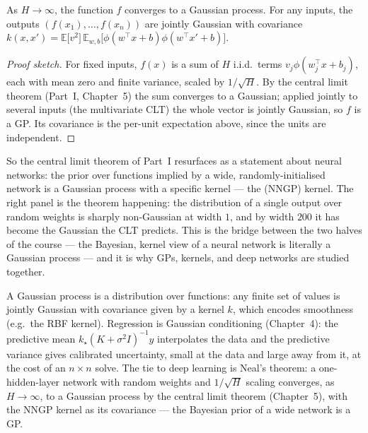 \documentclass[11pt]{article}
\begin{document}
\begin{theorem}
As $H\to\infty$, the function $f$ converges to a Gaussian process. For any inputs,
the outputs $(f(x_1),\dots,f(x_n))$ are jointly Gaussian with covariance
$k(x,x')=\mathbb{E}\big[v^2\big]\,\mathbb{E}_{w,b}\big[\phi(w^\top x+b)\phi(w^\top x'+b)\big]$.
\end{theorem}
\begin{proof}[Proof sketch]
For fixed inputs, $f(x)$ is a sum of $H$ i.i.d.\ terms $v_j\phi(w_j^\top x+b_j)$,
each with mean zero and finite variance, scaled by $1/\sqrt H$. By the central
limit theorem (Part~I, Chapter~5) the sum converges to a Gaussian; applied jointly
to several inputs (the multivariate CLT) the whole vector is jointly Gaussian, so
$f$ is a GP. Its covariance is the per-unit expectation above, since the units are
independent.
\end{proof}

So the central limit theorem of Part~I resurfaces as a statement about neural
networks: the prior over functions implied by a wide, randomly-initialised network
is a Gaussian process with a specific kernel --- the  (NNGP) kernel. The right panel is the theorem happening: the
distribution of a single output over random weights is sharply non-Gaussian at
width $1$, and by width $200$ it has become the Gaussian the CLT predicts. This is
the bridge between the two halves of the course --- the Bayesian, kernel view of a
neural network is literally a Gaussian process --- and it is why GPs, kernels, and
deep networks are studied together.

\begin{summarybox}
A Gaussian process is a distribution over functions: any finite set of values is
jointly Gaussian with covariance given by a kernel $k$, which encodes smoothness
(e.g.\ the RBF kernel). Regression is Gaussian conditioning (Chapter~4): the
predictive mean $k_\star(K+\sigma^2 I)^{-1}y$ interpolates the data and the
predictive variance gives calibrated uncertainty, small at the data and large
away from it, at the cost of an $n\times n$ solve. The tie to deep learning is
Neal's theorem: a one-hidden-layer network with random weights and
$1/\sqrt H$ scaling converges, as $H\to\infty$, to a Gaussian process by the
central limit theorem (Chapter~5), with the NNGP kernel as its covariance --- the
Bayesian prior of a wide network is a GP.
\end{summarybox}
\end{document}
